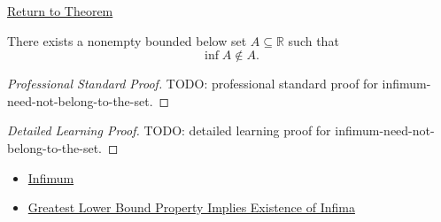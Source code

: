 \newpage
{}
\label{prf:infimum-need-not-belong-to-the-set}

\begin{remark*}[Return]
\hyperref[prop:infimum-need-not-belong-to-the-set]{Return to Theorem}
\end{remark*}

\begin{proposition*}
There exists a nonempty bounded below set $A\subseteq\mathbb{R}$ such that
\[
\inf A\notin A.
\]
\end{proposition*}

\begin{proof}[Professional Standard Proof]
\LRAProofBodyStart
TODO: professional standard proof for infimum-need-not-belong-to-the-set.
\end{proof}

\begin{proof}[Detailed Learning Proof]
\LRAProofBodyStart
TODO: detailed learning proof for infimum-need-not-belong-to-the-set.
\end{proof}

\begin{remark*}
\end{remark*}

\begin{dependencies}
\begin{itemize}
  \item \hyperref[def:infimum]{Infimum}
  \item \hyperref[thm:glb-property-implies-existence-of-infima]{Greatest Lower Bound Property Implies Existence of Infima}
\end{itemize}
\end{dependencies}

\clearpage
